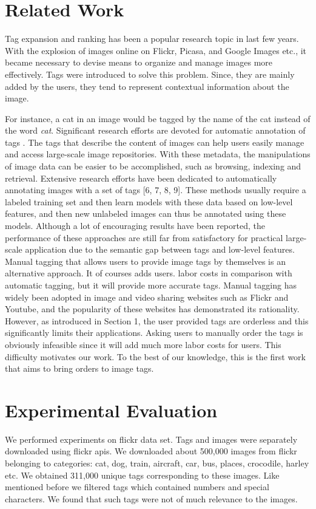 \documentclass[12pt]{article}
\begin{document}
\section{Related Work}
Tag expansion and ranking has been a popular research topic in last few years. With the explosion of
images online on Flickr, Picasa, and Google Images etc., it became necessary to devise means to
organize and manage images more effectively. Tags were introduced to solve this problem. Since,
they are mainly added by the users, they tend to represent contextual information about the image.

For instance, a cat in an image would be tagged by the name of the cat instead of the word \emph{cat}.
Significant research efforts are devoted for automatic annotation of tags .
The tags that describe the content of images can help
users easily manage and access large-scale image repositories.
With these metadata, the manipulations of image data
can be easier to be accomplished, such as browsing, indexing
and retrieval. Extensive research efforts have been dedicated
to automatically annotating images with a set of tags [6, 7,
8, 9]. These methods usually require a labeled training set
and then learn models with these data based on low-level features,
and then new unlabeled images can thus be annotated
using these models. Although a lot of encouraging results
have been reported, the performance of these approaches
are still far from satisfactory for practical large-scale application
due to the semantic gap between tags and low-level
features. Manual tagging that allows users to provide image
tags by themselves is an alternative approach. It of courses
adds users. labor costs in comparison with automatic tagging,
but it will provide more accurate tags. Manual tagging
has widely been adopted in image and video sharing websites
such as Flickr and Youtube, and the popularity of these
websites has demonstrated its rationality. However, as introduced
in Section 1, the user provided tags are orderless
and this significantly limits their applications. Asking users
to manually order the tags is obviously infeasible since it
will add much more labor costs for users. This difficulty
motivates our work. To the best of our knowledge, this is
the first work that aims to bring orders to image tags.

\section{Experimental Evaluation}
We performed experiments on flickr data set. Tags and images were separately downloaded using
flickr apis. We downloaded about 500,000 images from flickr belonging to categories: cat,
dog, train, aircraft, car, bus, places, crocodile, harley etc. We obtained 311,000 unique tags
corresponding to these images. Like mentioned before we filtered tags which contained numbers
and special characters. We found that such tags were not of much relevance to the images.
\end{document}
